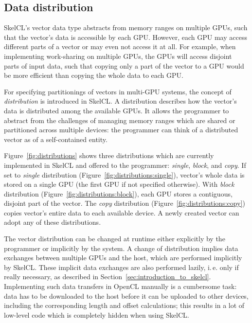 \subsection{Data distribution}

SkelCL's vector data type abstracts from memory ranges on multiple GPUs, such that the vector's data is accessible by each GPU.
However, each GPU may access different parts of a vector or may even not access it at all.
For example, when implementing work-sharing on multiple GPUs, the GPUs will access disjoint parts of input data, such that copying only a part of the vector to a GPU would be more efficient than copying the whole data to each GPU.

For specifying partitionings of vectors in multi-GPU systems, the concept of \emph{distribution} is introduced in SkelCL.
A distribution describes how the vector's data is distributed among the available GPUs.
It allows the programmer to abstract from the challenges of managing memory ranges which are shared or partitioned across multiple devices: the programmer can think of a distributed vector as of a self-contained entity.

Figure~\ref{fig:distributions} shows three distributions which are currently implemented in SkelCL and offered to the programmer:
\emph{single}, \emph{block}, and \emph{copy}.
If set to \emph{single} distribution (Figure~\ref{fig:distributions:single}), vector's whole data is stored on a single GPU (the first GPU if not specified otherwise).
With \emph{block} distribution (Figure~\ref{fig:distributions:block}), each GPU stores a contiguous, disjoint part of the vector.
The \emph{copy} distribution (Figure~\ref{fig:distributions:copy}) copies vector's entire data to each available device.
A newly created vector can adopt any of these distributions.

The vector distribution can be changed at runtime either explicitly by the programmer or implicitly by the system.
A change of distribution implies data exchanges between multiple GPUs and the host, which are performed implicitly by SkelCL.
These implicit data exchanges are also performed lazily, i.\,e. only if really necessary, as described in Section~\ref{sec:introduction_to_skelcl}.
Implementing such data transfers in OpenCL manually is a cumbersome task:
data has to be downloaded to the host before it can be uploaded to other devices, including the corresponding length and offset calculations;
this results in a lot of low-level code which is completely hidden when using SkelCL.

